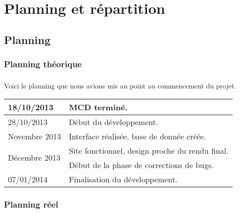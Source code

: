 \chapter{Planning et répartition}

\section{Planning}
    \subsection{Planning théorique}
        \paragraph{}
            Voici le planning que nous avions mis au point au commencement du
            projet.
        \begin{center}
            \begin{tabular}{|l|l|}
                \hline
                18/10/2013 & MCD terminé. \\
                \hline
                28/10/2013 & Début du développement. \\
                \hline
                Novembre 2013 & Interface réalisée, base de donnée créée. \\
                \hline
                \multirow{2}{*}{Décembre 2013}
                    & Site fonctionnel, design proche du rendu final. \\
                    & Début de la phase de corrections de bugs. \\
                \hline
                07/01/2014 & Finalisation du développement. \\
                \hline
            \end{tabular}
        \end{center}
    \subsection{Planning réel}
